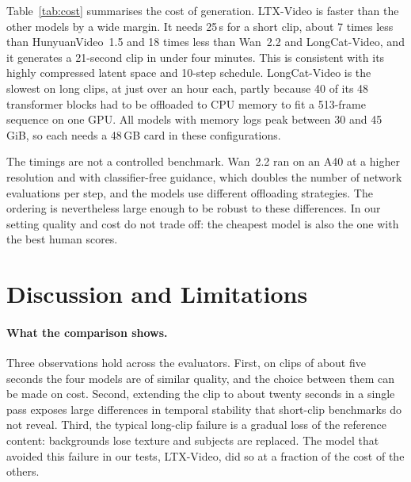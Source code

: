 \documentclass[11pt,a4paper]{article}
\begin{document}
Table~\ref{tab:cost} summarises the cost of generation. LTX-Video is faster than the other models by a wide margin. It needs 25\,s for a short clip, about 7 times less than HunyuanVideo~1.5 and 18 times less than Wan~2.2 and LongCat-Video, and it generates a 21-second clip in under four minutes. This is consistent with its highly compressed latent space and 10-step schedule. LongCat-Video is the slowest on long clips, at just over an hour each, partly because 40 of its 48 transformer blocks had to be offloaded to CPU memory to fit a 513-frame sequence on one GPU. All  models with memory logs peak between 30 and 45\,GiB, so each needs a 48\,GB card in these configurations.

The timings are not a controlled benchmark. Wan~2.2 ran on an A40 at a higher resolution and with classifier-free guidance, which doubles the number of network evaluations per step, and the models use different offloading strategies. The ordering is nevertheless large enough to be robust to these differences. In our setting quality and cost do not trade off: the cheapest model is also the one with the best human scores.

\section{Discussion and Limitations}
\label{sec:discussion}

\paragraph{What the comparison shows.}
Three observations hold across the evaluators. First, on clips of about five seconds the four models are of similar quality, and the choice between them can be made on cost. Second, extending the clip to about twenty seconds in a single pass exposes large differences in temporal stability that short-clip benchmarks do not reveal. Third, the typical long-clip failure is a gradual loss of the reference content: backgrounds lose texture and subjects are replaced. The model that avoided this failure in our tests, LTX-Video, did so at a fraction of the cost of the others.
\end{document}
